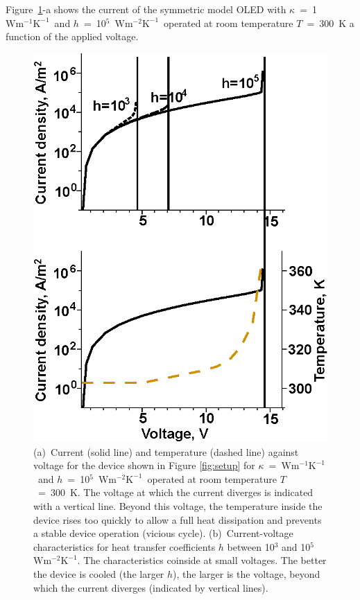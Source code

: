 \documentclass[%
9pt,
 aip,
rsi,%
 amsmath,amssymb,
preprint,%
]{revtex4-1}
\newcommand{\thermalconductivity}{$\mathrm{W m^{-1} K^{-1}}$}
\newcommand{\hcoefficient}{$\mathrm{W m^{-2} K^{-1}}$}
\begin{document}
Figure~\ref{fig:I-V}-a shows the current of the symmetric model OLED with $\kappa$~=~1~\thermalconductivity~and $h$~=~10$^{5}$~\hcoefficient~operated at room temperature $T$~=~300~K a function of the applied voltage.
%
\begin{figure}
\centering
\includegraphics{I-V.eps} 
\caption{(a)~Current (solid line) and temperature (dashed line) against voltage for the device shown in Figure \ref{fig:setup} for $\kappa$~=~\thermalconductivity~and $h$~=~10$^{5}$~\hcoefficient~operated at room temperature $T$~=~300~K. The voltage at which the current diverges is indicated with a vertical line. Beyond this voltage, the temperature inside the device rises too quickly to allow a full heat dissipation and prevents a stable device operation (vicious cycle). (b)~Current-voltage characteristics for heat transfer coefficients $h$ between 10$^{3}$ and 10$^{5}$~\hcoefficient. The characteristics coinside at small voltages. The better the device is cooled (the larger $h$), the larger is the voltage, beyond which the current diverges (indicated by vertical lines).}
\label{fig:I-V}
\end{figure}
\end{document}
